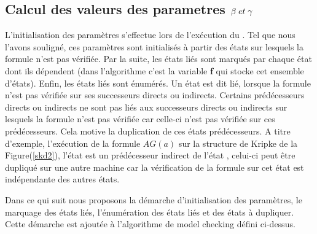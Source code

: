 
\subsection{Calcul des valeurs des parametres $\beta{} \; et\;\gamma{} $ }
 
{L'initialisation des paramètres s'effectue lors de l'exécution du \mc{}. Tel que nous l'avons souligné, ces paramètres  sont initialisés à partir des états sur lesquels la formule n'est pas vérifiée. Par la suite, les états liés sont marqués par chaque état dont ils dépendent (dans l'algorithme c'est la variable \textbf{f} qui stocke cet ensemble d'états). Enfin, les états liés sont énumérés. Un état est dit lié, lorsque la formule n'est pas vérifiée sur ses successeurs directs ou indirects. Certains prédécesseurs directs ou indirects ne sont pas liés aux successeurs directs ou indirects sur lesquels la formule n'est pas vérifiée car celle-ci n'est pas vérifiée sur ces prédécesseurs. Cela motive la duplication de ces états prédécesseurs. A titre d'exemple, l'exécution de la formule  \textit{$AG(a)$} sur la structure de Kripke de la Figure(\ref{skd2}), l'état \sneuf{} est un prédécesseur indirect de l'état , celui-ci peut être dupliqué sur une autre machine car la vérification de la formule sur cet état est indépendante des autres états. 

Dans ce qui suit nous proposons la démarche d'initialisation des paramètres, le marquage des états liés, l'énumération des états liés et des états à dupliquer. Cette démarche est ajoutée à l'algorithme de model checking défini ci-dessus.
}
